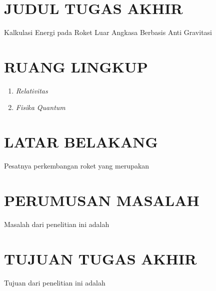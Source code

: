 \section{JUDUL TUGAS AKHIR}

Kalkulasi Energi pada Roket Luar Angkasa Berbasis Anti Gravitasi
\vspace{0.5ex}

\section{RUANG LINGKUP}

\begin{enumerate}[nolistsep]
  \item \textit{Relativitas}
  \item \textit{Fisika Quantum}
\end{enumerate}

\section{LATAR BELAKANG}

Pesatnya perkembangan roket yang merupakan \lipsum[1]

\lipsum[2]

\lipsum[3][1-10]

\section{PERUMUSAN MASALAH}

Masalah dari penelitian ini adalah \lipsum[1][1-6]

\section{TUJUAN TUGAS AKHIR}

Tujuan dari penelitian ini adalah \lipsum[1][1-6]